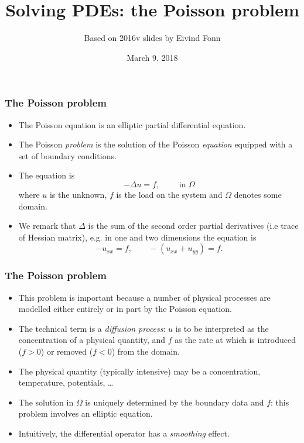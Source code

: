 

\title{Solving PDEs: the Poisson problem}
\date{March 9. 2018}
\author{Based on 2016v slides by Eivind Fonn}

\maketitle

\begin{frame}
  \frametitle{The Poisson problem}
\begin{itemize}
  \item The Poisson equation is an elliptic partial differential equation.
  \item The Poisson \emph{problem} is the solution of the Poisson
    \emph{equation} equipped with a set of boundary conditions.
  \item The equation is
    \[
      -\Delta u = f, \qquad \text{ in } \Omega
    \]
    where $u$ is the unknown, $f$ is the load on the system and $\Omega$ denotes
    some domain.
  \item We remark that $\Delta$ is the sum of the second order partial
    derivatives (i.e trace of Hessian matrix), e.g. in one and two dimensions the equation is
    \[
      -u_{xx} = f, \qquad -\left( u_{xx} + u_{yy} \right) = f.
    \]
\end{itemize}
\end{frame}

\begin{frame}[fragile]
  \frametitle{The Poisson problem}
  \begin{itemize}
  \item This problem is important because a number of physical processes are
    modelled either entirely or in part by the Poisson equation.
  \item The technical term is a \emph{diffusion process}: $u$ is to be
    interpreted as the concentration of a physical quantity, and $f$ as the rate at
    which  is introduced ($f > 0$) or removed ($f < 0$) from the
    domain.
  \item The physical quantity (typically intensive) may be a concentration, temperature, potentials, \dots
  \item The solution in $\Omega$ is uniquely determined by the boundary data and
    $f$: this problem involves an elliptic equation.
  \item Intuitively, the differential operator has a \textit{smoothing} effect.
  \end{itemize}
\end{frame}

